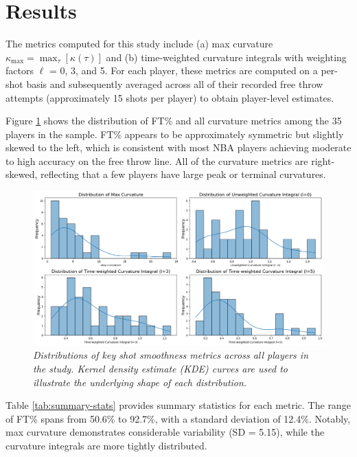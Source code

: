 \documentclass{article}
\begin{document}
\section{Results}
    
    The metrics computed for this study include (a) max curvature $\kappa_{\max} = \max_\tau[\kappa(\tau)]$ and (b) time-weighted curvature integrals with weighting factors $\ell$ = 0, 3, and 5. For each player, these metrics are computed on a per-shot basis and subsequently averaged across all of their recorded free throw attempts (approximately 15 shots per player) to obtain player-level estimates.

    Figure \ref{fig:scattered} shows the distribution of FT\% and all curvature metrics among the 35 players in the sample. FT\% appears to be approximately symmetric but slightly skewed to the left, which is consistent with most NBA players achieving moderate to high accuracy on the free throw line. All of the curvature metrics are right-skewed, reflecting that a few players have large peak or terminal curvatures.

    \begin{figure}[H]
        \centering
        \includegraphics[width=0.8\linewidth]{reports/arxiv/distributions.png}
        \caption{\it Distributions of key shot smoothness metrics across all players in the study. Kernel density estimate (KDE) curves are used to illustrate the underlying shape of each distribution.}
        \label{fig:scattered}
    \end{figure}
    
    Table \ref{tab:summary-stats} provides summary statistics for each metric. The range of FT\% spans from 50.6\% to 92.7\%, with a standard deviation of 12.4\%. Notably, max curvature demonstrates considerable variability (SD = 5.15), while the curvature integrals are more tightly distributed.
\end{document}
